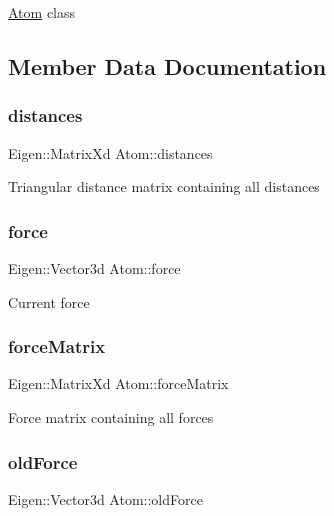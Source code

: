 \mbox{\hyperlink{class_atom}{Atom}} class 

\subsection{Member Data Documentation}
\mbox{\label{class_atom_a7ac21eb5765267ccafe658634c7cc45f}} 
\subsubsection{\texorpdfstring{distances}{distances}}
{\footnotesize\ttfamily Eigen\+::\+Matrix\+Xd Atom\+::distances\hspace{0.3cm}{\ttfamily [static]}}

Triangular distance matrix containing all distances \mbox{\label{class_atom_a33b530b8900b57bfa933ae79c7e95d71}} 
\subsubsection{\texorpdfstring{force}{force}}
{\footnotesize\ttfamily Eigen\+::\+Vector3d Atom\+::force}

Current force \mbox{\label{class_atom_a8fadf04e83f1558c13192f91eee5348a}} 
\subsubsection{\texorpdfstring{force\+Matrix}{forceMatrix}}
{\footnotesize\ttfamily Eigen\+::\+Matrix\+Xd Atom\+::force\+Matrix\hspace{0.3cm}{\ttfamily [static]}}

Force matrix containing all forces \mbox{\label{class_atom_af5b2daf8c6f32465b0ab1aecab57915b}} 
\subsubsection{\texorpdfstring{old\+Force}{oldForce}}
{\footnotesize\ttfamily Eigen\+::\+Vector3d Atom\+::old\+Force}

